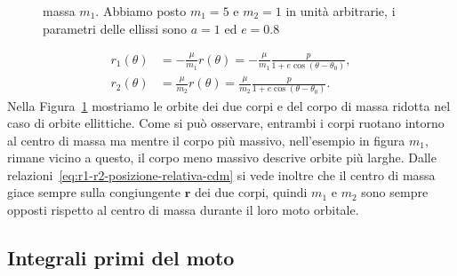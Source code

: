 {\begin{figure}
{    massa $m_1$. Abbiamo posto $m_1=5$ e $m_2=1$ in unità arbitrarie, i
    parametri delle ellissi sono $a=1$ ed $e=0.8$}
  \label{fig:orbite-ellittiche}
\end{figure}
\begin{subequations}
  \begin{align}
    r_1(\theta) &= -\frac{\mu}{m_1}r(\theta) =
    -\frac{\mu}{m_1}\frac{p}{1+e\cos(\theta - \theta_0)},\\
    r_2(\theta) &= \frac{\mu}{m_2}r(\theta) =
    \frac{\mu}{m_2}\frac{p}{1+e\cos(\theta - \theta_0)}.
  \end{align}
\end{subequations}
Nella Figura~\ref{fig:orbite-ellittiche} mostriamo le orbite dei due corpi e del
corpo di massa ridotta nel caso di orbite ellittiche. Come si può osservare,
entrambi i corpi ruotano intorno al centro di massa ma mentre il corpo più
massivo, nell'esempio in figura $m_1$, rimane vicino a questo, il corpo meno
massivo descrive orbite più larghe. Dalle
relazioni~\eqref{eq:r1-r2-posizione-relativa-cdm} si vede inoltre che il centro
di massa giace sempre sulla congiungente $\bm{r}$ dei due corpi, quindi $m_1$ e
$m_2$ sono sempre opposti rispetto al centro di massa durante il loro moto
orbitale.

\subsection{Integrali primi del moto}
\label{sec:integrali-primi}

}
